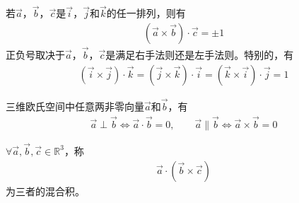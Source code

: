 \begin{theorem}若$\vec a$，$\vec b$，$\vec c$是$\vec i$，$\vec j$和$\vec k$的任一排列，则有
  \begin{align*}
    (\vec a\times \vec b)\cdot \vec c = \pm 1
  \end{align*}
  正负号取决于$\vec a$，$\vec b$，$\vec c$是满足右手法则还是左手法则。特别的，有
  \begin{align*}
    (\vec i\times \vec j)\cdot \vec k =
    (\vec j\times \vec k)\cdot \vec i =
    (\vec k\times \vec i)\cdot \vec j = 1
  \end{align*}
\end{theorem}

\begin{theorem}三维欧氏空间中任意两非零向量$\vec a$和$\vec b$，有
  \begin{align*}
    \vec a \perp     \vec b \iff \vec a \cdot  \vec b = 0,\quad\quad
    \vec a \parallel \vec b \iff \vec a \times \vec b = 0
  \end{align*}
\end{theorem}


\begin{definition}
  $\forall \vec a,\vec b,\vec c\in\mathbb{R}^3$，称
  \begin{align*}
    \vec a\cdot(\vec b\times\vec c)
  \end{align*}
  为三者的混合积。
\end{definition}

